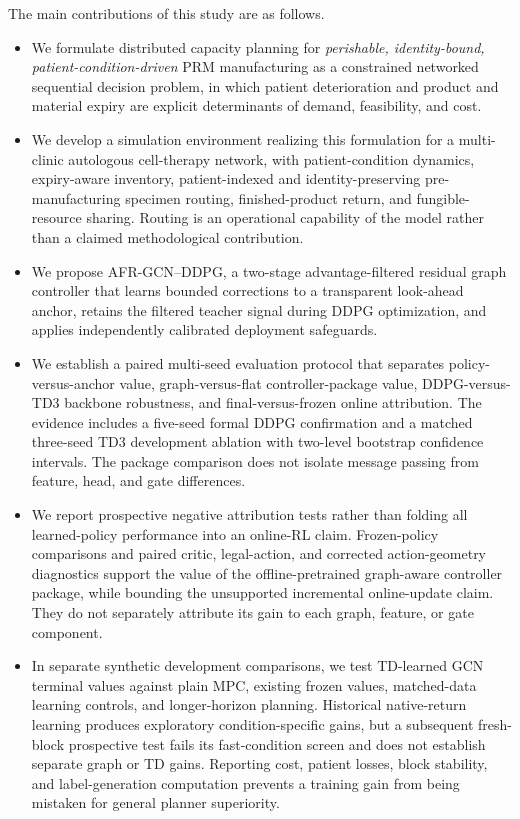 \documentclass[preprint,review,12pt]{elsarticle}
\begin{document}
The main contributions of this study are as follows.
\begin{itemize}
    \item We formulate distributed capacity planning for \emph{perishable, identity-bound, patient-condition-driven} PRM manufacturing as a constrained networked sequential decision problem, in which patient deterioration and product and material expiry are explicit determinants of demand, feasibility, and cost.
    \item We develop a simulation environment realizing this formulation for a multi-clinic autologous cell-therapy network, with patient-condition dynamics, expiry-aware inventory, patient-indexed and identity-preserving pre-manufacturing specimen routing, finished-product return, and fungible-resource sharing. Routing is an operational capability of the model rather than a claimed methodological contribution.
    \item We propose AFR-GCN--DDPG, a two-stage advantage-filtered residual graph controller that learns bounded corrections to a transparent look-ahead anchor, retains the filtered teacher signal during DDPG optimization, and applies independently calibrated deployment safeguards.
    \item We establish a paired multi-seed evaluation protocol that separates policy-versus-anchor value, graph-versus-flat controller-package value, DDPG-versus-TD3 backbone robustness, and final-versus-frozen online attribution. The evidence includes a five-seed formal DDPG confirmation and a matched three-seed TD3 development ablation with two-level bootstrap confidence intervals. The package comparison does not isolate message passing from feature, head, and gate differences.
    \item We report prospective negative attribution tests rather than folding all learned-policy performance into an online-RL claim. Frozen-policy comparisons and paired critic, legal-action, and corrected action-geometry diagnostics support the value of the offline-pretrained graph-aware controller package, while bounding the unsupported incremental online-update claim. They do not separately attribute its gain to each graph, feature, or gate component.
    \item In separate synthetic development comparisons, we test TD-learned GCN terminal values against plain MPC, existing frozen values, matched-data learning controls, and longer-horizon planning. Historical native-return learning produces exploratory condition-specific gains, but a subsequent fresh-block prospective test fails its fast-condition screen and does not establish separate graph or TD gains. Reporting cost, patient losses, block stability, and label-generation computation prevents a training gain from being mistaken for general planner superiority.

\end{itemize}
\end{document}
